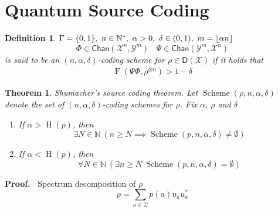 \documentclass[aps,pra,onecolumn,notitlepage,superscriptaddress]{revtex4-1}
\DeclarePairedDelimiter{\floor}{\lfloor}{\rfloor}
\newcommand{\N}{\mathbb{N}}
\newcommand{\spc}[1]{\mathcal{#1}}
\newcommand{\D}{\mathsf{D}}
\newcommand{\op}[1]{\operatorname{#1}}
\newcommand{\Chan}{{\mathsf{Chan}}}
\newtheorem{theo}{Theorem}
\newtheorem{defi}{Definition}
\def\Proof{{\bf Proof.~}}
\begin{document}
    \section{Quantum Source Coding}
    \begin{defi}
        $\Gamma = \{ 0,1 \}, \ n \in \N^*,\ \alpha > 0,\ \delta \in (0,1), \ m = \floor{\alpha n}$
        \begin{equation}
            \Phi \in \Chan(\spc X^n, \spc Y^m) \ \ \ \ \Psi \in \Chan(\spc Y^m, \spc X^n)
        \end{equation}
        is said to be an $(n,\alpha,\delta)$-coding scheme for $\rho \in \D(\spc X)$ if it holds that
        \begin{align}
            \op F(\Psi\Phi, \rho^{\otimes n}) > 1-\delta
        \end{align}
    \end{defi}

    \begin{theo}
        Shumacher's source coding theorem. 
        Let $\op{Scheme}(\rho,n,\alpha,\delta)$ denote the set of $(n,\alpha,\delta)$-coding schemes for $\rho$. Fix $\alpha$, $\rho$ and $\delta$
        \begin{enumerate}
            \item If $\alpha > \op H(p)$, then
            \begin{equation}
                \exists N \in \N \ (n \geq N \implies \op{Scheme}(p,n,\alpha,\delta) \neq \emptyset)
            \end{equation}

            \item If $\alpha < \op H(p)$, then
            \begin{equation}
                \forall N \in \N \ (\exists n \geq N \ \op{Scheme}(p,n,\alpha,\delta) = \emptyset)
            \end{equation}
        \end{enumerate}
    \end{theo}
    \Proof
    Spectrum decomposition of $\rho$
    \begin{equation}
        \rho = \sum_{a \in \Sigma} p(a) u_au_a^*
    \end{equation}
\end{document}
